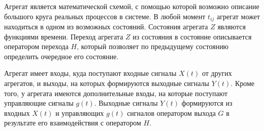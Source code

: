 Агрегат является математической схемой, с помощью которой возможно описание
большого круга реальных процессов в системе. В любой момент $t_{ij}$ агрегат
может находиться в одном из возможных состояний. Состояния агрегата $Z$
являются функциями времени. Переход агрегата $Z$ из состояния в состояние
описывается оператором перехода $H$, который позволяет по предыдущему
состоянию определить очередное его состояние.

Агрегат имеет входы, куда поступают входные сигналы $X(t)$ от других
агрегатов, и выходы, на которых формируются выходные сигналы $Y(t)$. Кроме
того, у агрегата имеются дополнительные входы, на которые поступают
управляющие сигналы $g(t)$. Выходные сигналы $Y(t)$ формируются из входных
$X(t)$ и управляющих $g(t)$ сигналов оператором выхода $G$ в результате его
взаимодействия с оператором $H$.

\clearpage
